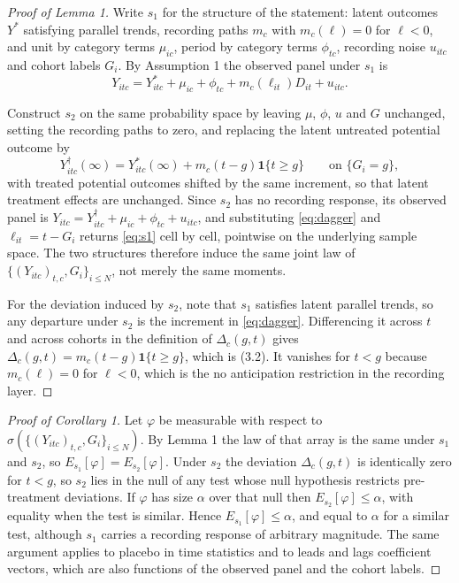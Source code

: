 \documentclass[12pt]{article}
\theoremstyle{definition}
\numberwithin{equation}{section}
\begin{document}
\begin{proof}[Proof of Lemma 1]
Write $s_1$ for the structure of the statement: latent outcomes $Y^{*}$
satisfying parallel trends, recording paths $m_c$ with $m_c(\ell)=0$ for
$\ell<0$, and unit by category terms $\mu_{ic}$, period by category terms
$\phi_{tc}$, recording noise $u_{itc}$ and cohort labels $G_i$. By Assumption
1 the observed panel under $s_1$ is
\begin{equation}
\label{eq:s1}
Y_{itc} = Y^{*}_{itc} + \mu_{ic} + \phi_{tc} + m_c(\ell_{it})D_{it} + u_{itc}.
\end{equation}

Construct $s_2$ on the same probability space by leaving
$\mu$, $\phi$, $u$ and $G$ unchanged, setting the recording paths to zero, and
replacing the latent untreated potential outcome by
\begin{equation}
\label{eq:dagger}
Y^{\dagger}_{itc}(\infty) = Y^{*}_{itc}(\infty) + m_c(t-g)\mathbf 1\{t \ge g\}
\qquad \text{on } \{G_i = g\},
\end{equation}
with treated potential outcomes shifted by the same increment, so that latent
treatment effects are unchanged. Since $s_2$ has no recording response, its
observed panel is $Y_{itc} = Y^{\dagger}_{itc} + \mu_{ic} + \phi_{tc} +
u_{itc}$, and substituting \eqref{eq:dagger} and $\ell_{it} = t - G_i$ returns
\eqref{eq:s1} cell by cell, pointwise on the underlying sample space. The two
structures therefore induce the same joint law of
$\{(Y_{itc})_{t,c}, G_i\}_{i \le N}$, not merely the same moments.

For the deviation induced by $s_2$, note that $s_1$ satisfies latent parallel
trends, so any departure under $s_2$ is the increment in \eqref{eq:dagger}.
Differencing it across $t$ and across cohorts in the definition of
$\Delta_c(g,t)$ gives $\Delta_c(g,t) = m_c(t-g)\mathbf 1\{t \ge g\}$, which is
(3.2). It vanishes for $t < g$ because $m_c(\ell) = 0$ for
$\ell < 0$, which is the no anticipation restriction in the recording layer.
\end{proof}

\begin{proof}[Proof of Corollary 1]
Let $\varphi$ be measurable with respect to $\sigma(\{(Y_{itc})_{t,c},G_i\}_{i
\le N})$. By Lemma 1 the law of that array is the same under $s_1$ and
$s_2$, so $E_{s_1}[\varphi] = E_{s_2}[\varphi]$. Under $s_2$ the deviation
$\Delta_c(g,t)$ is identically zero for $t<g$, so $s_2$ lies in the null of any
test whose null hypothesis restricts pre-treatment deviations. If $\varphi$ has
size $\alpha$ over that null then $E_{s_2}[\varphi] \le \alpha$, with equality
when the test is similar. Hence $E_{s_1}[\varphi] \le \alpha$, and equal to
$\alpha$ for a similar test, although $s_1$ carries a recording response of
arbitrary magnitude. The same argument applies to placebo in time statistics and
to leads and lags coefficient vectors, which are also functions of the observed
panel and the cohort labels.
\end{proof}
\end{document}
